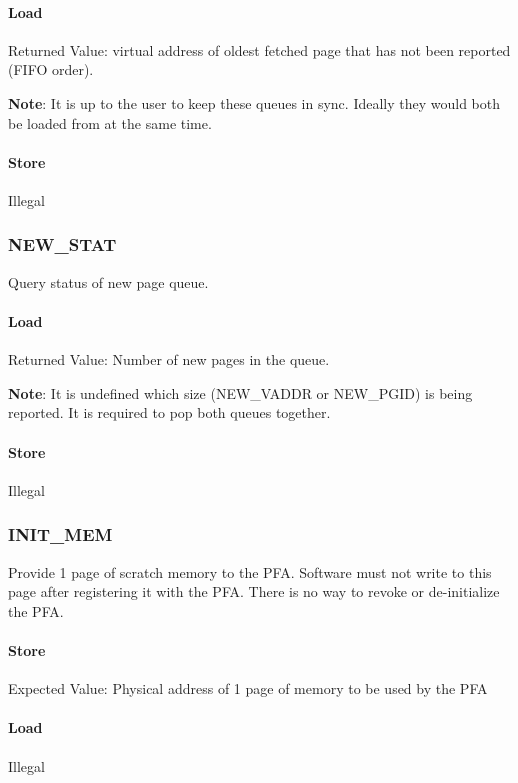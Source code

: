 \paragraph{Load}
Returned Value: virtual address of oldest fetched page that has not been
reported (FIFO order).

\noindent
\textbf{Note}: It is up to the user to keep these queues in sync. Ideally they would
both be loaded from at the same time.

\paragraph{Store}
Illegal

\subsubsection{NEW\_STAT}
Query status of new page queue.

\paragraph{Load}
Returned Value: Number of new pages in the queue.

\noindent
\textbf{Note}: It is undefined which size (NEW\_VADDR or NEW\_PGID) is being reported.
It is required to pop both queues together.

\paragraph{Store}
Illegal

\subsubsection{INIT\_MEM}
Provide 1 page of scratch memory to the PFA. Software must not write to this
page after registering it with the PFA. There is no way to revoke or
de-initialize the PFA.

\paragraph{Store}
Expected Value: Physical address of 1 page of memory to be used by the PFA

\paragraph{Load}
Illegal
